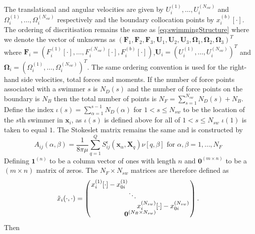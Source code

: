 The translational and angular velocities are given by $U_i^{(1)},\dots,U_i^{(N_{sw})}$ and $\Omega_i^{(1)},\dots,\Omega_i^{(N_{sw})}$ respectively and the boundary collocation points by $x_i^{(b)}[\cdot]$. The ordering of discritisation remains the same as \cref{eq:swimmingStructure} where we denote the vector of unknowns as \newline $(\bm{F}_1, \bm{F}_2, \bm{F}_3, \bm{U}_1,\bm{U}_2,\bm{U}_3,\bm{\Omega}_1,\bm{\Omega}_2,\bm{\Omega}_3)^T$ where $\bm{F}_i = (F_i^{(1)}[\cdot],\dots,F_i^{(N_{sw})}[\cdot],F_i^{(b)}[\cdot])$,\newline $\bm{U}_i = (U_i^{(1)},\dots,U_i^{(N_{sw})})^T$ and $\bm{\Omega}_i = (\Omega_i^{(1)},\dots,\Omega_i^{(N_{sw})})^T$. The same ordering convention is used for the right-hand side velocities, total forces and moments. If the number of force points associated with a swimmer $s$ is $N_{D}(s)$ and the number of force points on the boundary is $N_B$ then the total number of points is $N_F=\sum_{s=1}^{N_{sw}} N_D(s) + N_B$. Define the index $\iota(s)=\sum_{\alpha=1}^{s-1}N_D(\alpha)$ for $1<s\leq N_{sw}$ to be the location of the $s$th swimmer in $\bm{x}_i$, as $\iota(s)$ is defined above for all of $1<s\leq N_{sw}$ $\iota(1)$ is taken to equal $1$. The Stokeslet matrix remains the same and is constructed by
\begin{equation*}
    A_{ij}(\alpha,\beta) = \frac{1}{8\pi\mu} \sum_{q=1}^Q S_{ij}^\epsilon (\bm{x}_\alpha,\bm{X}_{q})\nu[q,\beta] \text { for } \alpha,\beta = 1,\dots,N_F
\end{equation*}
Defining $\bm{1}^{(n)}$ to be a column vector of ones with length $n$ and $\bm{0}^{(m\times n)}$ to be a $(m\times n)$ matrix of zeros. The $N_F \times N_{sw}$ matrices are therefore defined as
\begin{equation*}
\arraycolsep=0.4pt\def\arraystretch{0.8}
    \tilde{x}_i(\cdot,\cdot)=\left(\begin{array}{c}
         \begin{array}{ccc}
             x_i^{(1)}[\cdot]-x_{0i}^{(1)} & & \\
              & \ddots & \\
              & & x_i^{(N_{sw})}[\cdot]-x_{0i}^{(N_{sw})}
         \end{array}\\
         \bm{0}^{(N_B \times N_{sw})}
    \end{array}\right).
\end{equation*}
Then

